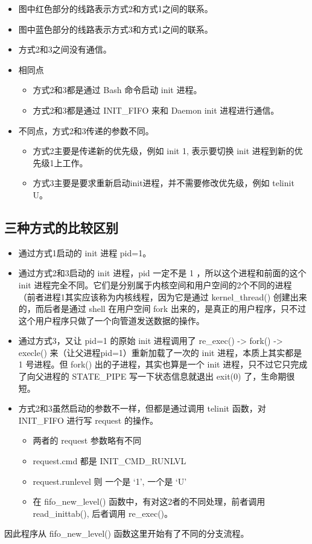 \begin{itemize}
\item
  图中红色部分的线路表示方式2和方式1之间的联系。
\item
  图中蓝色部分的线路表示方式3和方式1之间的联系。
\item
  方式2和3之间没有通信。
\item
  相同点
  \begin{itemize}
  \item
    方式2和3都是通过 Bash 命令启动 init 进程。
  \item
    方式2和3都是通过 INIT\_FIFO 来和 Daemon init 进程进行通信。
  \end{itemize}
\item
  不同点，方式2和3传递的参数不同。
  \begin{itemize}
  \item
    方式2主要是传递新的优先级，例如 init 1, 表示要切换 init
    进程到新的优先级1上工作。
  \item
    方式3主要是要求重新启动init进程，并不需要修改优先级，例如 telinit U。
  \end{itemize}
\end{itemize}
\subsection{三种方式的比较区别}

\begin{itemize}
\item
  通过方式1启动的 init 进程 pid=1。
\item
  通过方式2和3启动的 init 进程，pid 一定不是 1 ，所以这个进程和前面的这个
  init
  进程完全不同。它们是分别属于内核空间和用户空间的2个不同的进程（前者进程1其实应该称为内核线程，因为它是通过
  kernel\_thread() 创建出来的，而后者是通过 shell 在用户空间 fork
  出来的，是真正的用户程序，只不过这个用户程序只做了一个向管道发送数据的操作。
\item
  通过方式3，又让 pid=1 的原始 init 进程调用了 re\_exec() -\textgreater{}
  fork() -\textgreater{} execle() 来（让父进程pid=1）重新加载了一次的 init
  进程，本质上其实都是 1 号进程。但 fork() 出的子进程，其实也算是一个 init
  进程，只不过它只完成了向父进程的 STATE\_PIPE 写一下状态信息就退出
  exit(0) 了，生命期很短。
\item
  方式2和3虽然启动的参数不一样，但都是通过调用 telinit 函数，对 INIT\_FIFO
  进行写 request 的操作。
  \begin{itemize}
  \item
    两者的 request 参数略有不同
  \item
    request.cmd 都是 INIT\_CMD\_RUNLVL
  \item
    request.runlevel 则 一个是 `1', 一个是 `U'
  \item
    在 fifo\_new\_level() 函数中，有对这2者的不同处理，前者调用
    read\_inittab(), 后者调用 re\_exec()。
  \end{itemize}
\end{itemize}
因此程序从 fifo\_new\_level() 函数这里开始有了不同的分支流程。

